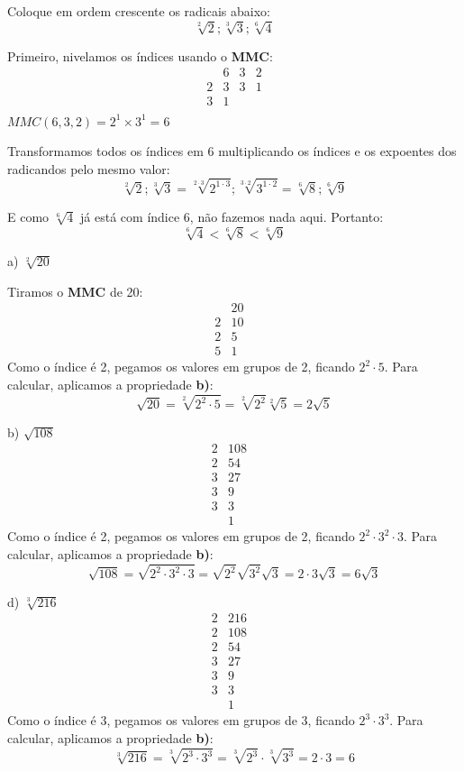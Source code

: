 \documentclass[letterpaper]{book}
\begin{document}
Coloque em ordem crescente os radicais abaixo:
\[\sqrt[2]{2};\sqrt[3]{3};\sqrt[6]{4}\]

Primeiro, nivelamos os índices usando o \textbf{MMC}:
\[
\begin{array}{c|ccc}
& 6 & 3 & 2 \\
\hline
2 & 3 & 3 & 1 \\
3 & 1 & & \\
\end{array}
\]
\(MMC(6,3,2) = 2^{1} \times 3^{1} = 6\)

Transformamos todos os índices em 6 multiplicando os índices e os expoentes dos radicandos pelo mesmo valor:
\[\sqrt[2]{2};\sqrt[3]{3} = \sqrt[2 \cdot 3]{2^{1 \cdot 3}};\sqrt[3 \cdot 2]{3^{1 \cdot 2}} = \sqrt[6]{8};\sqrt[6]{9}\]

E como \(\sqrt[6]{4}\) já está com índice 6, não fazemos nada aqui.
Portanto:
\[\sqrt[6]{4} < \sqrt[6]{8} < \sqrt[6]{9}\]

a) \(\sqrt[2]{20}\)

Tiramos o \textbf{MMC} de 20:
\[
\begin{array}{c|ccc}
& 20\\
\hline
2 & 10\\
2 & 5 & \\
5 & 1
\end{array}
\]
Como o índice é 2, pegamos os valores em grupos de 2, ficando \(2^{2} \cdot 5\). Para calcular, aplicamos a propriedade \textbf{b)}:
\[\sqrt{20} = \sqrt[2]{2^{2} \cdot 5} = \sqrt[2]{2^{2}} \sqrt[2]{5} = 2\sqrt{5}\]

b) \(\sqrt{108}\)
\[
\begin{array}{c|ccc}
2 & 108\\
\hline
2 & 54\\
3 & 27 & \\
3 & 9 \\
3 & 3 \\
  & 1
\end{array}
\]
Como o índice é 2, pegamos os valores em grupos de 2, ficando \(2^{2} \cdot 3^{2} \cdot 3\). Para calcular, aplicamos a propriedade \textbf{b)}:
\[\sqrt{108} = \sqrt{2^{2} \cdot 3^{2} \cdot 3} = \sqrt{2^{2}} \sqrt{3^{2}} \sqrt{3} = 2 \cdot 3 \sqrt{3} = 6\sqrt{3}\]

d) \(\sqrt[3]{216}\)
\[
\begin{array}{c|ccc}
2 & 216\\
\hline
2 & 108\\
2 & 54 & \\
3 & 27 \\
3 & 9 \\
3 & 3 \\
  & 1
\end{array}
\]
Como o índice é 3, pegamos os valores em grupos de 3, ficando \(2^{3} \cdot 3^{3}\). Para calcular, aplicamos a propriedade \textbf{b)}:
\[\sqrt[3]{216} = \sqrt[3]{2^{3} \cdot 3^{3}} = \sqrt[3]{2^{3}} \cdot \sqrt[3]{3^{3}} = 2 \cdot 3 = 6\]
\end{document}
